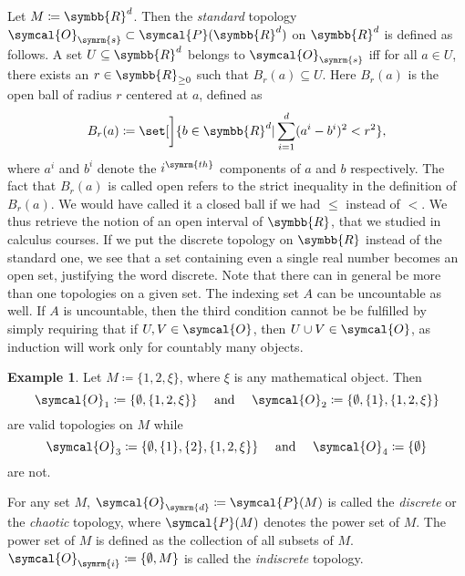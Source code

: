 \documentclass[a4 paper, 12pt]{book}
\theoremstyle{definition}
\newtheorem{exmp}{Example}
\newcommand{\rr}{\symbb{R}}
\newcommand{\topology}{\symcal{O}}
\newcommand{\powerset}{\symcal{P}}
\newcommand{\ball}{B}
\begin{document}
    Let \(M \coloneq \rr^d\). Then the \textit{standard} topology \(\topology_{\symrm{s}} \subset \powerset(\rr^d)\) on \(\rr^d\) is defined as follows. A set \(U \subseteq \rr^d\) belongs to \(\topology_{\symrm{s}}\) iff for all \(a \in U\), there exists an \(r \in \rr_{\geq 0}\) such that \(\ball_r(a) \subseteq U\). Here \(\ball_r(a)\) is the open ball of radius \(r\) centered at \(a\), defined as 
    \[
        \ball_r(a) \coloneq \set[\bigg]{b \in \rr^d | \sum_{i=1}^d (a^i - b^i)^2 < r^2},
    \] 
    where \(a^i\) and \(b^i\) denote the \(i^{\symrm{th}}\) components of \(a\) and \(b\) respectively. The fact that \(\ball_r(a)\) is called open refers to the strict inequality in the definition of \(\ball_r(a)\). We would have called it a closed ball if we had \(\leq\) instead of \(<\). We thus retrieve the notion of an open interval of \(\rr\), that we studied in calculus courses. If we put the discrete topology on \(\rr\) instead of the standard one, we see that a set containing even a single real number becomes an open set, justifying the word discrete.    Note that there can in general be more than one topologies on a given set. The indexing set \(A\) can be uncountable as well. If \(A\) is uncountable, then the third condition cannot be be fulfilled by simply requiring that if \(U,V \in \topology\), then \(U \cup V \in \topology\), as induction will work only for countably many objects.
    \begin{exmp}
        Let \(M \coloneq \{1, 2, \xi\}\), where \(\xi\) is any mathematical object. Then \[\topology_1 \coloneq \{\emptyset, \{1, 2, \xi\}\} \quad \text{ and } \quad \topology_2 \coloneq \{\emptyset, \{1\}, \{1, 2, \xi\}\}\] are valid topologies on \(M\) while \[\topology_3 \coloneq \{\emptyset, \{1\}, \{2\}, \{1, 2, \xi\}\} \quad \text{ and } \quad \topology_4 \coloneq \{\emptyset\}\] are not.
    \end{exmp}
    For any set \(M\), \(\topology_{\symrm{d}} \coloneq \powerset(M)\) is called the \textit{discrete} or the \textit{chaotic} topology, where \(\powerset(M)\) denotes the power set of \(M\). The power set of \(M\) is defined as the collection of all subsets of \(M\). \(\topology_{\symrm{i}} \coloneq \{\emptyset, M\}\) is called the \textit{indiscrete} topology.
\end{document}

